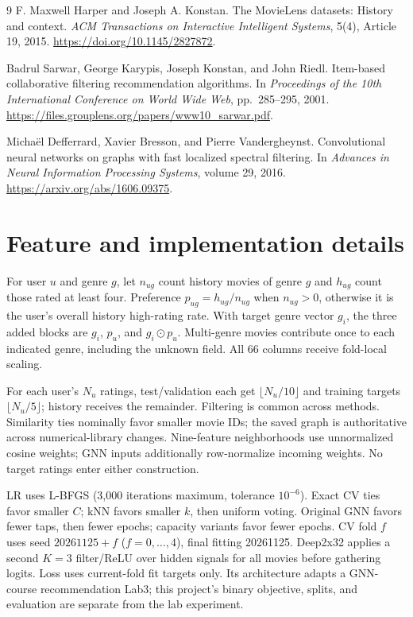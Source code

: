 \documentclass{article}
\begin{document}
\clearpage
\begin{thebibliography}{9}
F. Maxwell Harper and Joseph A. Konstan.
The MovieLens datasets: History and context.
\emph{ACM Transactions on Interactive Intelligent Systems}, 5(4), Article 19, 2015.
\url{https://doi.org/10.1145/2827872}.

Badrul Sarwar, George Karypis, Joseph Konstan, and John Riedl.
Item-based collaborative filtering recommendation algorithms.
In \emph{Proceedings of the 10th International Conference on World Wide Web}, pp.\ 285--295, 2001.
\url{https://files.grouplens.org/papers/www10_sarwar.pdf}.

Micha\"el Defferrard, Xavier Bresson, and Pierre Vandergheynst.
Convolutional neural networks on graphs with fast localized spectral filtering.
In \emph{Advances in Neural Information Processing Systems}, volume 29, 2016.
\url{https://arxiv.org/abs/1606.09375}.
\end{thebibliography}

\clearpage
\appendix
\section{Feature and implementation details}
For user $u$ and genre $g$, let $n_{ug}$ count history movies of genre $g$ and $h_{ug}$ count those rated at least four. Preference $p_{ug}=h_{ug}/n_{ug}$ when $n_{ug}>0$, otherwise it is the user's overall history high-rating rate. With target genre vector $g_i$, the three added blocks are $g_i$, $p_u$, and $g_i\odot p_u$. Multi-genre movies contribute once to each indicated genre, including the unknown field. All 66 columns receive fold-local scaling.

For each user's $N_u$ ratings, test/validation each get $\lfloor N_u/10\rfloor$ and training targets $\lfloor N_u/5\rfloor$; history receives the remainder. Filtering is common across methods. Similarity ties nominally favor smaller movie IDs; the saved graph is authoritative across numerical-library changes. Nine-feature neighborhoods use unnormalized cosine weights; GNN inputs additionally row-normalize incoming weights. No target ratings enter either construction.

LR uses L-BFGS (3,000 iterations maximum, tolerance $10^{-6}$). Exact CV ties favor smaller $C$; kNN favors smaller $k$, then uniform voting. Original GNN favors fewer taps, then fewer epochs; capacity variants favor fewer epochs. CV fold $f$ uses seed $20261125+f$ ($f=0,\ldots,4$), final fitting 20261125. Deep2x32 applies a second $K=3$ filter/ReLU over hidden signals for all movies before gathering logits. Loss uses current-fold fit targets only. Its architecture adapts a GNN-course recommendation Lab3; this project's binary objective, splits, and evaluation are separate from the lab experiment.
\end{document}
